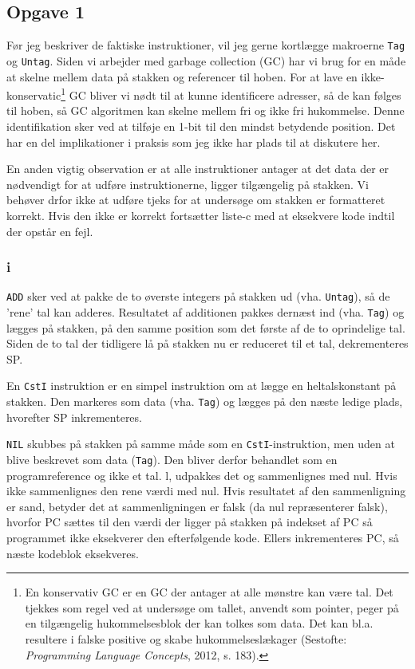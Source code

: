 \documentclass{article}
\begin{document}
\subsection*{Opgave 1}
Før jeg beskriver de faktiske instruktioner, vil jeg gerne kortlægge makroerne \texttt{Tag} og \texttt{Untag}. Siden vi arbejder med garbage collection (GC) har vi brug for en måde at skelne mellem data på stakken og referencer til hoben. For at lave en ikke-konservatic\footnote{En konservativ GC er en GC der antager at alle mønstre kan være tal. Det tjekkes som regel ved at undersøge om tallet, anvendt som pointer, peger på en tilgængelig hukommelsesblok der kan tolkes som data. Det kan bl.a. resultere i falske positive og skabe hukommelseslækager (Sestofte: \textit{Programming Language Concepts}, 2012, s. 183).} GC bliver vi nødt til at kunne identificere adresser, så de kan følges til hoben, så GC algoritmen kan skelne mellem fri og ikke fri hukommelse. Denne identifikation sker ved at tilføje en 1-bit til den mindst betydende position. Det har en del implikationer i praksis som jeg ikke har plads til at diskutere her.

En anden vigtig observation er at alle instruktioner antager at det data der er nødvendigt for at udføre instruktionerne, ligger tilgængelig på stakken. Vi behøver drfor ikke at udføre tjeks for at undersøge om stakken er formatteret korrekt. Hvis den ikke er korrekt fortsætter liste-c med at eksekvere kode indtil der opstår en fejl.

\subsubsection*{i}
\texttt{ADD} sker ved at pakke de to øverste integers på stakken ud (vha. \texttt{Untag}), så de 'rene' tal kan adderes. Resultatet af additionen pakkes dernæst ind (vha. \texttt{Tag}) og lægges på stakken, på den samme position som det første af de to oprindelige tal. Siden de to tal der tidligere lå på stakken nu er reduceret til et tal, dekrementeres SP.

En \texttt{CstI} instruktion er en simpel instruktion om at lægge en heltalskonstant på stakken. Den markeres som data (vha. \texttt{Tag}) og lægges på den næste ledige plads, hvorefter SP inkrementeres.

\texttt{NIL} skubbes på stakken på samme måde som en \texttt{CstI}-instruktion, men uden at blive beskrevet som data (\texttt{Tag}). Den bliver derfor behandlet som en programreference og ikke et tal.
l, udpakkes det og sammenlignes med nul. Hvis ikke sammenlignes den rene værdi med nul. Hvis resultatet af den sammenligning er sand, betyder det at sammenligningen er falsk (da nul repræsenterer falsk), hvorfor PC sættes til den værdi der ligger på stakken på indekset af PC så programmet ikke eksekverer den efterfølgende kode. Ellers inkrementeres PC, så næste kodeblok eksekveres.
\end{document}
